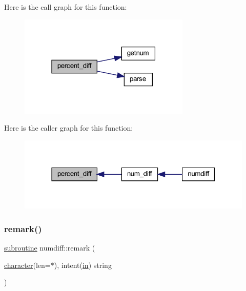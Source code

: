 Here is the call graph for this function\+:
\nopagebreak
\begin{figure}[H]
\begin{center}
\leavevmode
\includegraphics[width=231pt]{numdiff_8f90_a3a10618690bb709040a044704b25ec7d_cgraph}
\end{center}
\end{figure}
Here is the caller graph for this function\+:
\nopagebreak
\begin{figure}[H]
\begin{center}
\leavevmode
\includegraphics[width=318pt]{numdiff_8f90_a3a10618690bb709040a044704b25ec7d_icgraph}
\end{center}
\end{figure}
\mbox{\label{numdiff_8f90_ab59cb8434f0791b438eb140dd577e0cc}} 
\subsubsection{\texorpdfstring{remark()}{remark()}}
{\footnotesize\ttfamily \hyperlink{M__stopwatch_83_8txt_acfbcff50169d691ff02d4a123ed70482}{subroutine} numdiff\+::remark (\begin{DoxyParamCaption}\item[{\hyperlink{option__stopwatch_83_8txt_abd4b21fbbd175834027b5224bfe97e66}{character}(len=$\ast$), intent(\hyperlink{M__journal_83_8txt_afce72651d1eed785a2132bee863b2f38}{in})}]{string }\end{DoxyParamCaption})}

